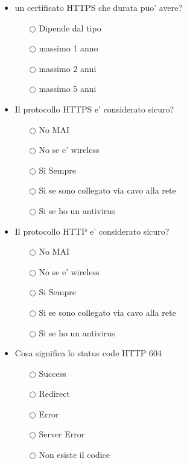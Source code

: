 \documentclass[10pt,twocolumn]{article}
\begin{document}
\begin{itemize}
    \item un certificato HTTPS che durata puo' avere?
          \begin{itemize}
              \item[$\bigcirc$] Dipende dal tipo
              \item[$\bigcirc$] massimo 1 anno
              \item[$\bigcirc$] massimo 2 anni
              \item[$\bigcirc$] massimo 5 anni
          \end{itemize}
\end{itemize}
\begin{itemize}
    \item Il protocollo HTTPS e' considerato sicuro?
          \begin{itemize}
              \item[$\bigcirc$] No MAI
              \item[$\bigcirc$] No se e' wireless
              \item[$\bigcirc$] Si Sempre
              \item[$\bigcirc$] Si se sono collegato via cavo alla rete
              \item[$\bigcirc$] Si se ho un antivirus
          \end{itemize}
\end{itemize}
\begin{itemize}
    \item Il protocollo HTTP e' considerato sicuro?
          \begin{itemize}
              \item[$\bigcirc$] No MAI
              \item[$\bigcirc$] No se e' wireless
              \item[$\bigcirc$] Si Sempre
              \item[$\bigcirc$] Si se sono collegato via cavo alla rete
              \item[$\bigcirc$] Si se ho un antivirus
          \end{itemize}
\end{itemize}
\begin{itemize}
    \item Cosa significa lo status code HTTP 604
          \begin{itemize}
              \item[$\bigcirc$] Success
              \item[$\bigcirc$] Redirect
              \item[$\bigcirc$] Error
              \item[$\bigcirc$] Server Error
              \item[$\bigcirc$] Non esiste il codice
          \end{itemize}
\end{itemize}
\end{document}
